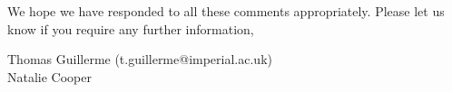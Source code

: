 \documentclass[12pt,letterpaper]{article}
\begin{document}
We hope we have responded to all these comments appropriately. Please let us know if you require any further information,\\
\bigskip



Thomas Guillerme (t.guillerme@imperial.ac.uk)\\ %
Natalie Cooper
\end{document}
